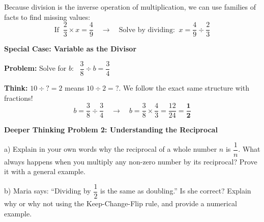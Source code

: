 \documentclass[12pt, letterpaper, fleql]{article}
\begin{document}
\vspace{3mm}
\noindent
Because division is the inverse operation of multiplication, we can use families of facts to find missing values:
$$\text{If } \ \frac{2}{3} \times x = \frac{4}{9} \quad \longrightarrow \quad \text{Solve by dividing: } \ x = \frac{4}{9} \div \frac{2}{3}$$

\vspace{3mm}

\begin{tcolorbox}[colback=white, colframe=black!25, boxrule=0.6pt, arc=4mm, left=6mm, right=6mm, top=5mm, bottom=5mm]
\textbf{Special Case: Variable as the Divisor}

\medskip
\textbf{Problem:} Solve for $b$: \ $\dfrac{3}{8} \div b = \dfrac{3}{4}$

\medskip
\noindent
\textbf{Think:} $10 \div ? = 2$ means $10 \div 2 = ?$. We follow the exact same structure with fractions!
$$b = \frac{3}{8} \div \frac{3}{4} \quad \rightarrow \quad b = \frac{3}{8} \times \frac{4}{3} = \frac{12}{24} = \mathbf{\frac{1}{2}}$$
\end{tcolorbox}

\vspace{4mm}
\begin{tcolorbox}[colback=white!5, colframe=black, boxrule=1pt, arc=4mm, left=6mm, right=6mm, top=5mm, bottom=5mm]
\textbf{Deeper Thinking Problem 2: Understanding the Reciprocal}
\medskip

\noindent
a) Explain in your own words why the reciprocal of a whole number $n$ is $\dfrac{1}{n}$. What always happens when you multiply any non-zero number by its reciprocal? Prove it with a general example.
\vspace{3cm}

\noindent
b) Maria says: ``Dividing by $\dfrac{1}{2}$ is the same as doubling.'' Is she correct? Explain why or why not using the Keep-Change-Flip rule, and provide a numerical example.

\vspace{2cm}
\end{tcolorbox}
\newpage
\end{document}
